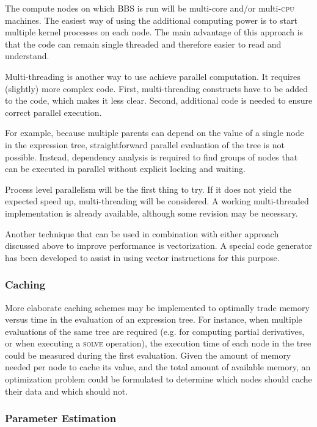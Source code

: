 \documentclass[10pt]{lofar}
\newcommand{\solve}{\textsc{solve}\xspace}
\begin{document}
The compute nodes on which BBS is run will be multi-core and/or
multi-\textsc{cpu} machines. The easiest way of using the additional computing
power is to start multiple kernel processes on each node. The main advantage of
this approach is that the code can remain single threaded and therefore easier
to read and understand.

Multi-threading is another way to use achieve parallel computation. It requires
(slightly) more complex code. First, multi-threading constructs have to be added
to the code, which makes it less clear. Second, additional code is needed to
ensure correct parallel execution.

For example, because multiple parents can depend on the value of a single node
in the expression tree, straightforward parallel evaluation of the tree is not
possible. Instead, dependency analysis is required to find groups of nodes that
can be executed in parallel without explicit locking and waiting.

Process level parallelism will be the first thing to try. If it does not yield
the expected speed up, multi-threading will be considered. A working
multi-threaded implementation is already available, although some revision may
be necessary.

Another technique that can be used in combination with either approach discussed
above to improve performance is vectorization. A special code generator has been
developed to assist in using vector instructions for this purpose.

\subsubsection{Caching}
\label{subsubsec:performance-caching}

More elaborate caching schemes may be implemented to optimally trade memory
versus time in the evaluation of an expression tree. For instance, when multiple
evaluations of the same tree are required (e.g. for computing partial
derivatives, or when executing a \solve operation), the execution time of each
node in the tree could be measured during the first evaluation. Given the amount
of memory needed per node to cache its value, and the total amount of available
memory, an optimization problem could be formulated to determine which nodes
should cache their data and which should not. 

\subsubsection{Parameter Estimation}
\label{subsubsec:performance-parameter-estimation}
\end{document}
